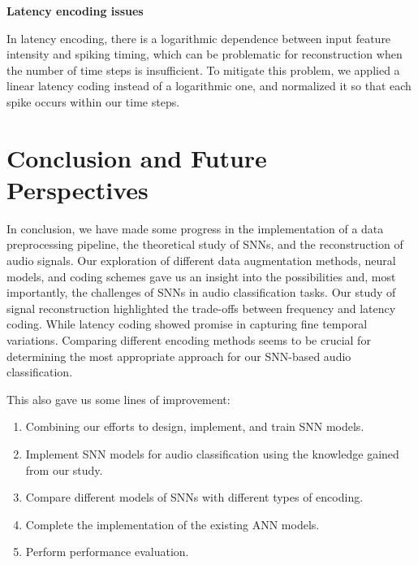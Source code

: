 \documentclass[11pt]{article}
\begin{document}
\textbf{Latency encoding issues}

In latency encoding, there is a logarithmic dependence between input feature intensity and spiking timing, which can be problematic for reconstruction when the number of time steps is insufficient. To mitigate this problem, we applied a linear latency coding instead of a logarithmic one, and normalized it so that each spike occurs within our time steps.



\pagebreak


\section{Conclusion and Future Perspectives}

In conclusion, we have made some progress in the implementation of a data preprocessing pipeline, the theoretical study of SNNs, and the reconstruction of audio signals.
Our exploration of different data augmentation methods, neural models, and coding schemes gave us an insight into the possibilities and, most importantly, the challenges of SNNs in audio classification tasks.
Our study of signal reconstruction highlighted the trade-offs between frequency and latency coding. While latency coding showed promise in capturing fine temporal variations.
Comparing different encoding methods seems to be crucial for determining the most appropriate approach for our SNN-based audio classification.

This also gave us some lines of improvement:

\begin{enumerate}
  \item Combining our efforts to design, implement, and train SNN models.
  \item Implement SNN models for audio classification using the knowledge gained from our study.
  \item Compare different models of SNNs with different types of encoding.
  \item Complete the implementation of the existing ANN models.
  \item Perform performance evaluation.
\end{enumerate}

\pagebreak
\end{document}
